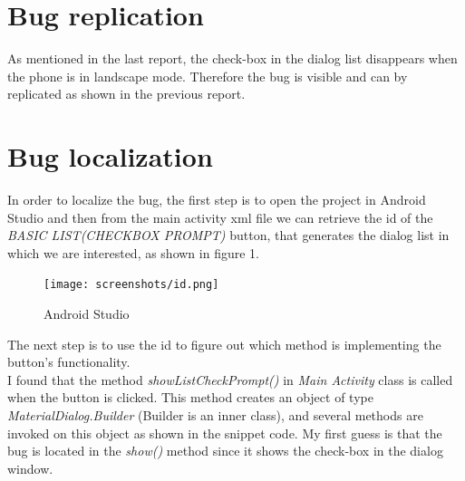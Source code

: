 \documentclass[12pt]{report}
\begin{document}
\section*{Bug replication}
  As mentioned in the last report, the check-box in the dialog list disappears when the phone is in landscape mode. Therefore the bug is visible and can by replicated as shown in the previous report.


\section*{Bug localization}
  In order to localize the bug, the first step is to open the project in Android Studio and then from the main activity xml file we can retrieve the id of the \emph{BASIC LIST(CHECKBOX PROMPT)} button, that generates the dialog list in which we are interested, as shown in figure 1.
\begin{figure}[H]
  \centering
  \texttt{[image: screenshots/id.png]}
  \caption{Android Studio}
\end{figure}
\noindent
  The next step is to use the id to figure out which method is implementing the button's functionality.\\ 
  I found that the method \emph{showListCheckPrompt()} in \emph{Main Activity} class is called when the button is clicked. This method creates an object of type \emph{MaterialDialog.Builder} (Builder is an inner class), and several methods are invoked on this object as shown in the snippet code. My first guess is that the bug is located in the \emph{show()} method since it shows the check-box in the dialog window.
\end{document}
